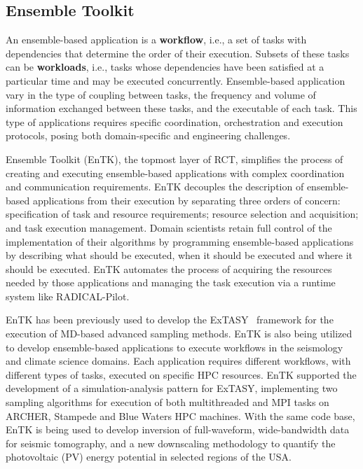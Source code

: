 \subsection{Ensemble Toolkit}

An ensemble-based application is a \textbf{workflow}, i.e., a set of tasks
with dependencies that determine the order of their execution. Subsets of
these tasks can be \textbf{workloads}, i.e., tasks whose dependencies have
been satisfied at a particular time and may be executed concurrently.
Ensemble-based application vary in the type of coupling between tasks, the
frequency and volume of information exchanged 
between these tasks, and the executable of
each task. This type of applications requires specific coordination,
orchestration and execution protocols, posing both domain-specific and
engineering challenges.

Ensemble Toolkit (EnTK), the topmost layer of RCT, simplifies the process of
creating and executing ensemble-based applications with complex coordination
and communication requirements. EnTK decouples the description of
ensemble-based applications from their execution by separating three orders
of concern: specification of task and resource requirements; resource
selection and acquisition; and task execution management. Domain scientists 
retain full control of the implementation of their algorithms by programming
ensemble-based applications by describing what should be executed, when it
should be executed and where it should be executed. EnTK automates the process 
of acquiring the resources needed by those applications and managing the task 
execution via a runtime system like RADICAL-Pilot.


EnTK has been previously used to develop the 
ExTASY~\cite{balasubramanian2016extasy} framework for the execution of MD-based 
advanced sampling methods. EnTK is also being utilized to develop ensemble-based
applications to execute workflows in the seismology and climate science domains.
Each application requires different workflows, with different types of tasks, 
executed on specific HPC resources. EnTK supported the development of a 
simulation-analysis pattern for ExTASY, implementing two sampling algorithms for
execution of both multithreaded and MPI tasks on ARCHER, Stampede and Blue 
Waters HPC machines. With the same code base, EnTK is being used to develop 
inversion of full-waveform, wide-bandwidth data for seismic tomography, and a 
new downscaling methodology to quantify the photovoltaic (PV) energy potential 
in selected regions of the USA\@.

